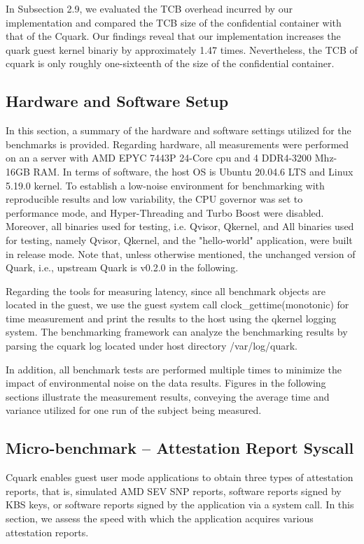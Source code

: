 In Subsection 2.9, we evaluated the TCB overhead incurred by our implementation and compared the TCB size of the confidential container with that of the Cquark. Our findings reveal that our implementation increases the quark guest kernel binariy by approximately 1.47 times. Nevertheless, the TCB of cquark is only roughly one-sixteenth of the size of the confidential container.

\subsection{Hardware and Software Setup}

In this section, a summary of the hardware and software settings utilized for the benchmarks is provided. Regarding hardware, all measurements were performed on an a server with AMD EPYC 7443P 24-Core cpu and 4 DDR4-3200 Mhz-16GB RAM. In terms of software, the host OS is Ubuntu 20.04.6 LTS and Linux 5.19.0 kernel. To establish a low-noise environment for benchmarking with reproducible results and low variability, the CPU governor was set to performance mode, and Hyper-Threading and Turbo Boost were disabled.  Moreover, all binaries used for testing, i.e. Qvisor, Qkernel, and All binaries used for testing, namely Qvisor, Qkernel, and the "hello-world" application, were built in release mode. Note that, unless otherwise mentioned, the unchanged version of Quark, i.e., upstream Quark is v0.2.0 in the following.


Regarding the tools for measuring latency, since all benchmark objects are located in the guest, we use the guest system call clock\_gettime(monotonic) for time measurement and print the results to the host using the qkernel logging system. The benchmarking framework can analyze the benchmarking results by parsing the cquark log located under host directory /var/log/quark.

In addition, all benchmark tests are performed multiple times to minimize the impact of environmental noise on the data results. Figures in the following sections illustrate the measurement results, conveying the average time and variance utilized for one run of the subject being measured.


\subsection{Micro-benchmark – Attestation Report Syscall}

Cquark enables guest user mode applications to obtain three types of attestation reports, that is, simulated AMD SEV SNP reports, software reports signed by KBS keys, or software reports signed by the application via a system call. In this section, we assess the speed with which the application 
acquires various attestation reports.

